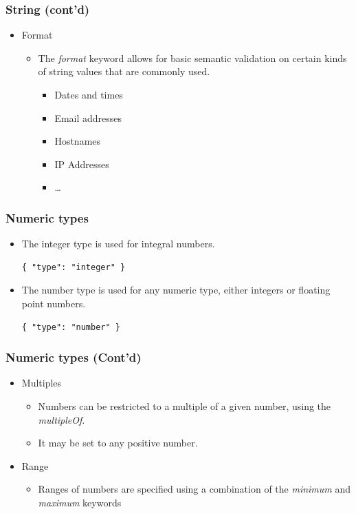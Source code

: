 \documentclass{efd-lecture}
\begin{document}
\begin{frame}
  \frametitle{String (cont'd)}
  \begin{itemize}
    \item Format
    \begin{itemize}
      \item The \textit{\color{Cyan}format} keyword allows for basic
        semantic validation on certain kinds of string values that are
        commonly used.
      \begin{itemize}
        \item Dates and times
        \item Email addresses
        \item Hostnames
        \item IP Addresses
        \item \ldots
      \end{itemize}
    \end{itemize}
  \end{itemize}
\end{frame}

\begin{frame}[fragile]
  \frametitle{Numeric types}
  \begin{itemize}
    \item The integer type is used for integral numbers.
    \begin{verbatim}
{ "type": "integer" }
    \end{verbatim}
    \item
      The number type is used for any numeric type, either integers or
      floating point numbers.

    \begin{verbatim}
{ "type": "number" }
    \end{verbatim}
  \end{itemize}
\end{frame}

\begin{frame}
  \frametitle{Numeric types (Cont'd)}
  \begin{itemize}
    \item Multiples
    \begin{itemize}
      \item
        Numbers can be restricted to a multiple of a given number, using the
        \textit{\color{YellowOrange}multipleOf}.

      \item It may be set to any positive number.
    \end{itemize}
    \item Range
    \begin{itemize}
      \item
        Ranges of numbers are specified using a combination of the
        \textit{\color{YellowOrange}minimum} and
        \textit{\color{YellowOrange}maximum} keywords

    \end{itemize}
  \end{itemize}
\end{frame}
\end{document}

